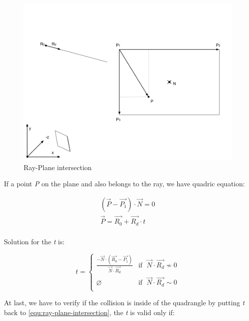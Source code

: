 \begin{figure}[H]
\caption[ray-plane-intersection]{Ray-Plane intersection}
\label{fig:ray-plane}
\centering
\includegraphics[width=\linewidth]{Figures/ray-plane-intersection.png}
\decoRule
\end{figure}

If a point \emph{P} on the plane and also belongs to the ray, we have quadric equation:

\begin{equation}
\label{equ:ray-plane-intersection}
\begin{array}{lr}
(\overrightarrow{P} - \overrightarrow{P_1}) \cdot \overrightarrow{N} = 0\\
\overrightarrow{P} = \overrightarrow{R_0} + \overrightarrow{R_d} \cdot t\\
\end{array}
\end{equation}

Solution for the \emph{t} is:

\[
t =
\begin{cases}
\frac{-\overrightarrow{N} \cdot (\overrightarrow{R_0} - \overrightarrow{P_1})}{\overrightarrow{N} \cdot \overrightarrow{R_d}} & \text{if }\;\overrightarrow{N} \cdot \overrightarrow{R_d} \nsim 0\\
\varnothing & \text{if }\;\overrightarrow{N} \cdot \overrightarrow{R_d} \sim 0\\
\end{cases}
\]

At last, we have to verify if the collision is inside of the quadrangle by putting \emph{t} back to \ref{equ:ray-plane-intersection}, \parencite{stackoverflow.ray-plane.2014} the \emph{t} is valid only if:\\

